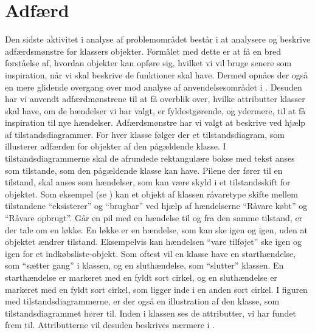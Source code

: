 \section{Adfærd}
\label{sec:adfaerd}

Den sidste aktivitet i analyse af problemområdet består i at analysere og beskrive adfærdsmønstre for klassers objekter. Formålet med dette er at få en bred forståelse af, hvordan objekter kan opføre sig, hvilket vi vil bruge senere som inspiration, når vi skal beskrive de funktioner \Foodl{} skal have. Dermed opnåes der også en mere glidende overgang over mod analyse af anvendelsesområdet i . Desuden har vi anvendt adfærdmønstrene til at få overblik over, hvilke attributter klasser skal have, om de hændelser vi har valgt, er fyldestgørende, og ydermere, til at få inspiration til nye hændelser. Adfærdsmønstre har vi valgt at beskrive ved hjælp af tilstandsdiagrammer. For hver klasse følger der et tilstandsdiagram, som illusterer adfærden for objekter af den pågældende klasse. I tilstandsdiagrammerne skal de afrundede rektangulære bokse med tekst anses som tilstande, som den pågældende klasse kan have. Pilene der fører til en tilstand, skal anses som hændelser, som kan være skyld i et tilstandsskift for objektet. Som eksempel (se ) kan et objekt af klassen råvaretype skifte mellem tilstandene ``eksisterer'' og ``brugbar'' ved hjælp af hændelserne ``Råvare købt'' og ``Råvare opbrugt''. Går en pil med en hændelse til og fra den samme tilstand, er der tale om en løkke. En løkke er en hændelse, som kan ske igen og igen, uden at objektet ændrer tilstand. Eksempelvis kan hændelsen ``vare tilføjet'' ske igen og igen for et indkøbsliste-objekt. Som oftest vil en klasse have en starthændelse, som ``sætter gang'' i klassen, og en sluthændelse, som ``slutter'' klassen. En starthændelse er markeret med en fyldt sort cirkel, og en sluthændelse er markeret med en fyldt sort cirkel, som ligger inde i en anden sort cirkel. I figuren med tilstandsdiagrammerne, er der også en illustration af den klasse, som tilstandsdiagrammet hører til. Inden i klassen ses de attributter, vi har fundet frem til. Attributterne vil desuden beskrives nærmere i . 


%



%


